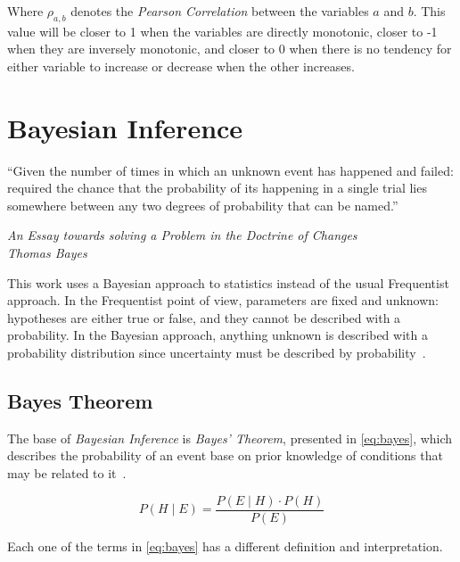 Where $\rho_{a,b}$ denotes the \emph{Pearson Correlation} between the variables $a$ and $b$. This value will be closer to 1 when the variables are directly monotonic, closer to -1 when they are inversely monotonic, and closer to 0 when there is no tendency for either variable to increase or decrease when the other increases.

\section{Bayesian Inference}

\epigraph{``Given the number of times in which an unknown event has happened and failed: required the chance that the probability of its happening in a single trial lies somewhere between any two degrees of probability that can be named.''}{\textit{An Essay towards solving a Problem in the Doctrine of Changes~\cite{bayes1763} \\ Thomas Bayes}}

This work uses a Bayesian approach to statistics instead of the usual Frequentist approach. In the Frequentist point of view, parameters are fixed and unknown: hypotheses are either true or false, and they cannot be described with a probability. In the Bayesian approach, anything unknown is described with a probability distribution since uncertainty must be described by probability~\cite{mackay}.

\subsection{Bayes Theorem}

The base of \emph{Bayesian Inference} is \emph{Bayes' Theorem}, presented in \cref{eq:bayes}, which describes the probability of an event base on prior knowledge of conditions that may be related to it~\cite{gelman2003}.

\begin{equation}
\label{eq:bayes}
	P \left( H \mid E \right) = \frac{P \left( E \mid H \right) \cdot P \left( H \right)}{P \left( E \right)}
\end{equation}

Each one of the terms in \cref{eq:bayes} has a different definition and interpretation.

